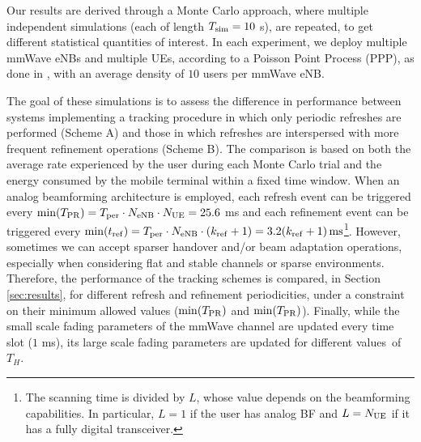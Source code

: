 \documentclass[conference]{IEEEtran}
\begin{document}
Our results are derived through a Monte Carlo approach, where multiple independent simulations (each of length $T_{\rm sim} = 10$ s), are repeated, to  get different statistical quantities of interest. In each experiment, we deploy multiple mmWave eNBs and multiple UEs, according to a Poisson Point Process (PPP), as done in \cite{Heath_coverage}, with an average density of $10$ users per mmWave eNB.

The goal of these simulations is to assess the difference in performance between systems
implementing a tracking procedure in which only periodic refreshes are performed (Scheme A) and those in which refreshes are interspersed with more frequent refinement operations (Scheme B).
The comparison is based  on both the average rate experienced by the user during each Monte Carlo trial and the energy consumed by the mobile terminal within a fixed time window. 
When an analog beamforming architecture is employed, each refresh event can be triggered every ${\min (T_{\rm PR}) = T_{\rm per} \cdot N_{\rm eNB} \cdot N_{\rm UE} = 25.6}$ ms and each refinement event can be triggered every ${\min (t_{\rm ref}) =  T_{\rm per} \cdot N_{\rm eNB} \cdot (k_{\rm ref}+1) = 3.2(k_{\rm ref}+1)}\, \rm ms$\footnote{\label{footnoteANB} The scanning time is divided by $L$, whose value depends on the beamforming capabilities. In particular, $L = 1$ if the user has analog BF and $L = N_{\rm UE}$ if it has a fully digital transceiver.}. 
However, sometimes we can accept sparser handover and/or beam adaptation operations, especially when considering flat and stable channels or sparse environments. 
Therefore, the performance of the tracking schemes is compared, in Section \ref{sec:results}, for different refresh and refinement periodicities, under a constraint on their minimum allowed values ($\min (T_{\rm PR})$ and $\min (T_{\rm PR})$). 
Finally, while the small scale fading parameters of the mmWave channel are updated every time slot ($1$ ms), its large scale fading parameters are updated for different values~of~$T_H$.
\end{document}
